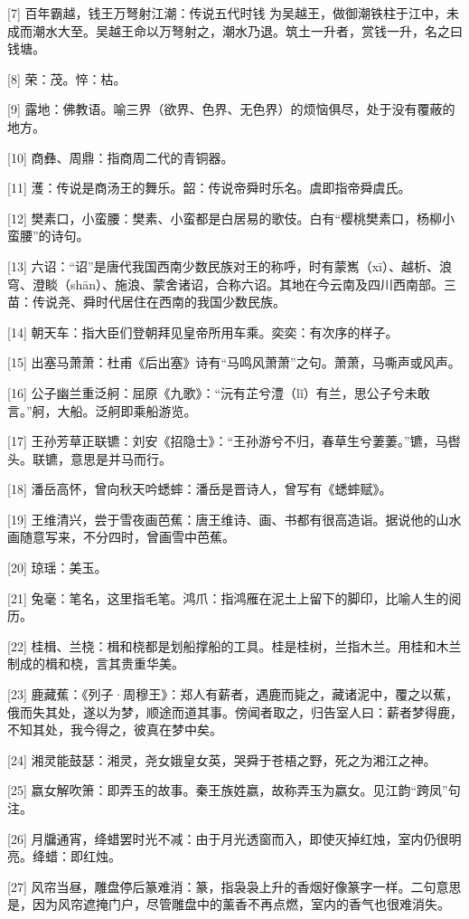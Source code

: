 \documentclass[12pt,UTF8]{ctexbook}
\begin{document}
[7] 百年霸越，钱王万弩射江潮：传说五代时钱 为吴越王，做御潮铁柱于江中，未成而潮水大至。吴越王命以万弩射之，潮水乃退。筑土一升者，赏钱一升，名之曰钱塘。

[8] 荣：茂。悴：枯。

[9] 露地：佛教语。喻三界（欲界、色界、无色界）的烦恼俱尽，处于没有覆蔽的地方。

[10] 商彝、周鼎：指商周二代的青铜器。

[11] 濩：传说是商汤王的舞乐。韶：传说帝舜时乐名。虞即指帝舜虞氏。

[12] 樊素口，小蛮腰：樊素、小蛮都是白居易的歌伎。白有“樱桃樊素口，杨柳小蛮腰”的诗句。

[13] 六诏：“诏”是唐代我国西南少数民族对王的称呼，时有蒙嶲（xī）、越析、浪穹、澄睒（shān）、施浪、蒙舍诸诏，合称六诏。其地在今云南及四川西南部。三苗：传说尧、舜时代居住在西南的我国少数民族。

[14] 朝天车：指大臣们登朝拜见皇帝所用车乘。奕奕：有次序的样子。

[15] 出塞马萧萧：杜甫《后出塞》诗有“马鸣风萧萧”之句。萧萧，马嘶声或风声。

[16] 公子幽兰重泛舸：屈原《九歌》：“沅有芷兮澧（lǐ）有兰，思公子兮未敢言。”舸，大船。泛舸即乘船游览。

[17] 王孙芳草正联镳：刘安《招隐士》：“王孙游兮不归，春草生兮萋萋。”镳，马辔头。联镳，意思是并马而行。

[18] 潘岳高怀，曾向秋天吟蟋蟀：潘岳是晋诗人，曾写有《蟋蟀赋》。

[19] 王维清兴，尝于雪夜画芭蕉：唐王维诗、画、书都有很高造诣。据说他的山水画随意写来，不分四时，曾画雪中芭蕉。

[20] 琼瑶：美玉。

[21] 兔毫：笔名，这里指毛笔。鸿爪：指鸿雁在泥土上留下的脚印，比喻人生的阅历。

[22] 桂楫、兰桡：楫和桡都是划船撑船的工具。桂是桂树，兰指木兰。用桂和木兰制成的楫和桡，言其贵重华美。

[23] 鹿藏蕉：《列子·周穆王》：郑人有薪者，遇鹿而毙之，藏诸泥中，覆之以蕉，俄而失其处，遂以为梦，顺途而道其事。傍闻者取之，归告室人曰：薪者梦得鹿，不知其处，我今得之，彼真在梦中矣。

[24] 湘灵能鼓瑟：湘灵，尧女娥皇女英，哭舜于苍梧之野，死之为湘江之神。

[25] 嬴女解吹箫：即弄玉的故事。秦王族姓嬴，故称弄玉为嬴女。见江韵“跨凤”句注。

[26] 月牖通宵，绛蜡罢时光不减：由于月光透窗而入，即使灭掉红烛，室内仍很明亮。绛蜡：即红烛。

[27] 风帘当昼，雕盘停后篆难消：篆，指袅袅上升的香烟好像篆字一样。二句意思是，因为风帘遮掩门户，尽管雕盘中的薰香不再点燃，室内的香气也很难消失。
\end{document}
